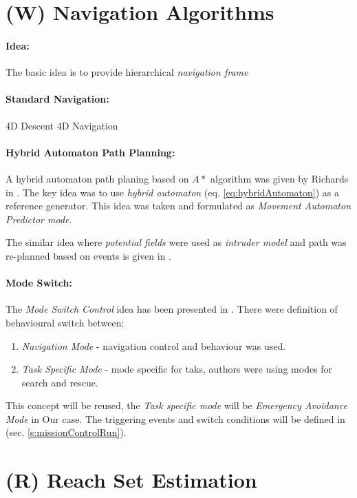 \section{(W) Navigation Algorithms}\label{s:NavigationAlgorithms}
\paragraph{Idea:} The basic idea is to provide hierarchical \emph{navigation frame}


\paragraph{Standard Navigation:}
4D Descent \cite{lim2018energy}
4D Navigation \cite{gardi2018multi}

\paragraph{Hybrid Automaton Path Planning:} A hybrid automaton path planing based on $A*$ algorithm was given by Richards in \cite{richards2004hybrid}. The key idea was to use \emph{hybrid automaton} (eq. \ref{eq:hybridAutomaton}) as a reference generator. This idea was taken and formulated as \emph{Movement Automaton Predictor mode}. 

The similar idea where \emph{potential fields} were used as \emph{intruder model} and path was re-planned  based on events is given in \cite{dong2011hybrid}.

\paragraph{Mode Switch:} The \emph{Mode Switch Control} idea has been presented in \cite{ryan2005mode}. There were definition of behavioural switch between:
\begin{enumerate}
    \item \emph{Navigation Mode} - navigation control and behaviour was used.
    \item \emph{Task Specific Mode} - mode specific for taks, authors were using modes for search and rescue. 
\end{enumerate}

This concept will be reused, the \emph{Task specific mode} will be \emph{Emergency Avoidance Mode} in Our case. The triggering events and switch conditions will be defined in (sec. \ref{s:missionControlRun}).


\section{(R) Reach Set Estimation}\label{s:ReachSetEstimationTheory}
